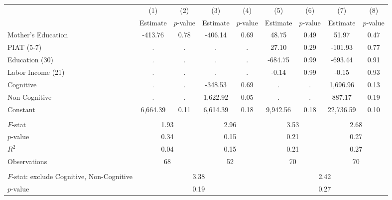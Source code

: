 \begin{tabular}{lcccccccc} \toprule
 & (1) & (2) & (3) & (4) & (5) & (6) & (7) & (8) \\
 & Estimate & $p$-value & Estimate & $p$-value  & Estimate & $p$-value  & Estimate & $p$-value  \\ \midrule 
Mother's Education &      -413.76 &         0.78 &      -406.14 &         0.69 &        48.75 &         0.49 &        51.97 &         0.47 \\  
PIAT (5-7) &            . &            . &            . &            . &        27.10 &         0.29 &      -101.93 &         0.77 \\  
Education (30) &            . &            . &            . &            . &      -684.75 &         0.99 &      -693.44 &         0.91 \\  
Labor Income (21) &            . &            . &            . &            . &        -0.14 &         0.99 &        -0.15 &         0.93 \\  
Cognitive &            . &            . &      -348.53 &         0.69 &            . &            . &     1,696.96 &         0.13 \\  
Non Cognitive &            . &            . &     1,622.92 &         0.05 &            . &            . &       887.17 &         0.19 \\  
Constant &     6,664.39 &         0.11 &     6,614.39 &         0.18 &     9,942.56 &         0.18 &    22,736.59 &         0.10 \\  \\ \midrule 
$F$-stat &          \multicolumn{2}{c}{1.93} &             \multicolumn{2}{c}{2.96} &            \multicolumn{2}{c}{3.53} &              \multicolumn{2}{c}{2.68}   \\  
$p$-value &          \multicolumn{2}{c}{0.34} &             \multicolumn{2}{c}{0.15} &            \multicolumn{2}{c}{0.21} &              \multicolumn{2}{c}{0.27}   \\  
$R^2$ &          \multicolumn{2}{c}{0.04} &             \multicolumn{2}{c}{0.15} &            \multicolumn{2}{c}{0.21} &              \multicolumn{2}{c}{0.27}   \\  
Observations &         \multicolumn{2}{c}{68} &                 \multicolumn{2}{c}{52} &               \multicolumn{2}{c}{70}  &                \multicolumn{2}{c}{70}   \\  \\ \midrule
$F$-stat: exclude Cognitive, Non-Cognitive  &                 \multicolumn{4}{c}{3.38} &              \multicolumn{4}{c}{2.42}  \\  
$p$-value &                \multicolumn{4}{c}{0.19} &               \multicolumn{4}{c}{0.27}  \\      \bottomrule \end{tabular}